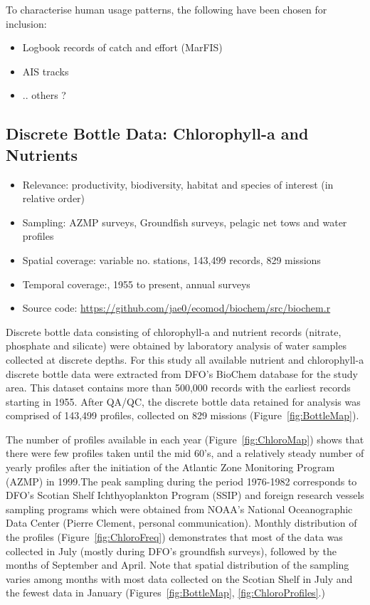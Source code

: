 \documentclass[letterpaper,portrait,11pt]{scrartcl}
\numberwithin{equation}{section}		%
\numberwithin{figure}{section}		%
\numberwithin{table}{section}				%
\begin{document}
To characterise human usage patterns, the following have been chosen for inclusion:

\begin{itemize}
	\item Logbook records of catch and effort (MarFIS)
  \item AIS tracks
  \item ..  others ?
\end{itemize}

\subsection{Discrete Bottle Data: Chlorophyll-a and Nutrients}

\begin{itemize}
  \item Relevance: productivity, biodiversity, habitat and species of interest (in relative order)
  \item Sampling: AZMP surveys, Groundfish surveys, pelagic net tows and water profiles
  \item Spatial coverage: variable no. stations, 143,499 records, 829 missions
  \item Temporal coverage:,  1955 to present, annual surveys
  \item Source code: \url{https://github.com/jae0/ecomod/biochem/src/biochem.r}
\end{itemize}

Discrete bottle data consisting of chlorophyll-a and nutrient records (nitrate, phosphate and silicate) were obtained by laboratory analysis of water samples collected at discrete depths. For this study all available nutrient and chlorophyll-a discrete bottle data were extracted from DFO's BioChem database for the study area. This dataset contains more than 500,000 records with the earliest records starting in 1955. After QA/QC, the discrete bottle data retained for analysis was comprised of 143,499 profiles, collected on 829 missions (Figure~\ref{fig:BottleMap}).

The number of profiles available in each year (Figure~\ref{fig:ChloroMap}) shows that there were few profiles taken until the mid 60's, and a relatively steady number of yearly profiles after the initiation of the Atlantic Zone Monitoring Program (AZMP) in 1999.The peak sampling during the period 1976-1982 corresponds to DFO's Scotian Shelf Ichthyoplankton Program (SSIP) and foreign research vessels sampling programs which were obtained from NOAA's National Oceanographic Data Center (Pierre Clement, personal communication).  Monthly distribution of the profiles (Figure~\ref{fig:ChloroFreq})  demonstrates that most of the data was collected in July (mostly during DFO's groundfish surveys), followed by the months of September and April. Note that spatial distribution of the sampling varies among months with most data collected on the Scotian Shelf in July and the fewest data in January (Figures~\ref{fig:BottleMap}, \ref{fig:ChloroProfiles}.)
\end{document}
